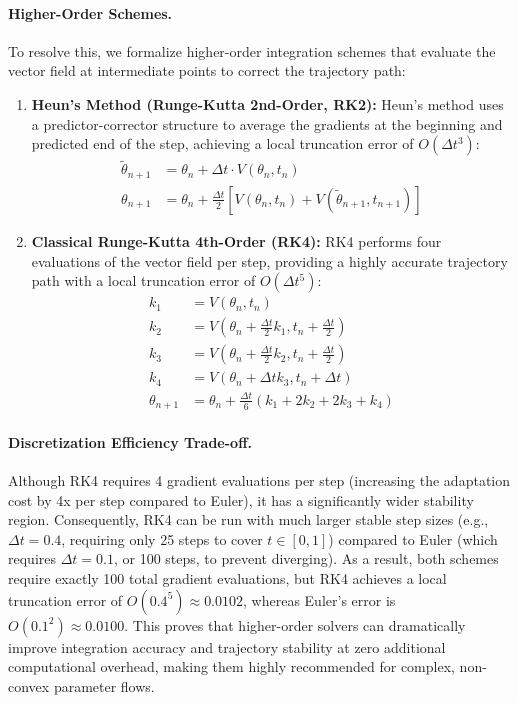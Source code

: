 \documentclass{article}
\theoremstyle{plain}
\theoremstyle{definition}
\theoremstyle{remark}
\begin{document}
\paragraph{Higher-Order Schemes.} To resolve this, we formalize higher-order integration schemes that evaluate the vector field at intermediate points to correct the trajectory path:
\begin{enumerate}
    \item \textbf{Heun's Method (Runge-Kutta 2nd-Order, RK2):}
          Heun's method uses a predictor-corrector structure to average the gradients at the beginning and predicted end of the step, achieving a local truncation error of $O(\Delta t^3)$:
          \begin{align}
          \tilde{\theta}_{n+1} &= \theta_n + \Delta t \cdot V(\theta_n, t_n) \\
          \theta_{n+1} &= \theta_n + \frac{\Delta t}{2} \left[ V(\theta_n, t_n) + V(\tilde{\theta}_{n+1}, t_{n+1}) \right]
          \end{align}
    \item \textbf{Classical Runge-Kutta 4th-Order (RK4):}
          RK4 performs four evaluations of the vector field per step, providing a highly accurate trajectory path with a local truncation error of $O(\Delta t^5)$:
          \begin{align}
          k_1 &= V(\theta_n, t_n) \\
          k_2 &= V\left(\theta_n + \frac{\Delta t}{2} k_1, t_n + \frac{\Delta t}{2}\right) \\
          k_3 &= V\left(\theta_n + \frac{\Delta t}{2} k_2, t_n + \frac{\Delta t}{2}\right) \\
          k_4 &= V\left(\theta_n + \Delta t k_3, t_n + \Delta t\right) \\
          \theta_{n+1} &= \theta_n + \frac{\Delta t}{6} \left( k_1 + 2k_2 + 2k_3 + k_4 \right)
          \end{align}
\end{enumerate}

\paragraph{Discretization Efficiency Trade-off.} Although RK4 requires 4 gradient evaluations per step (increasing the adaptation cost by 4x per step compared to Euler), it has a significantly wider stability region. Consequently, RK4 can be run with much larger stable step sizes (e.g., $\Delta t = 0.4$, requiring only 25 steps to cover $t \in [0, 1]$) compared to Euler (which requires $\Delta t = 0.1$, or 100 steps, to prevent diverging). As a result, both schemes require exactly 100 total gradient evaluations, but RK4 achieves a local truncation error of $O(0.4^5) \approx 0.0102$, whereas Euler's error is $O(0.1^2) \approx 0.0100$. This proves that higher-order solvers can dramatically improve integration accuracy and trajectory stability at zero additional computational overhead, making them highly recommended for complex, non-convex parameter flows.
\end{document}
